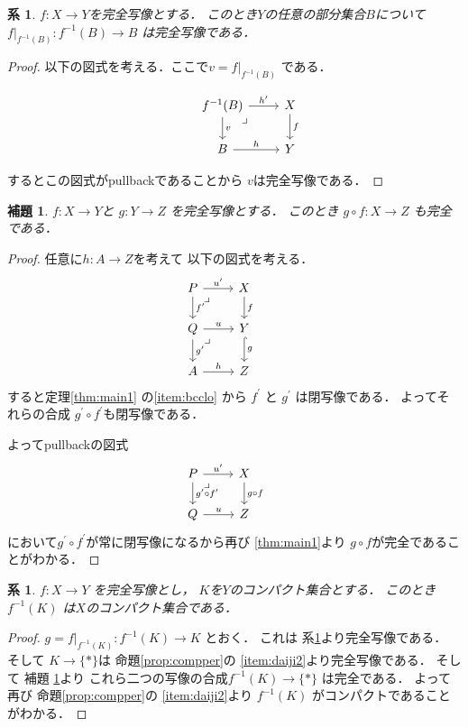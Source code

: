 \documentclass[leqno, a4paper, 12pt, dvipdfmx]{jsarticle}
\newtheorem{cor}[thm]{系}
\newtheorem{lem}[thm]{補題}
\begin{document}
\begin{cor}\label{cor:seigen}
$f\colon X\to Y$を完全写像とする．
このとき$Y$の任意の部分集合$B$について
$f|_{f^{-1}(B)}\colon f^{-1}(B)\to B$
は完全写像である．
\end{cor}
\begin{proof}
以下の図式を考える．ここで$v=f|_{f^{-1}(B)}$
である．

\[
\begin{tikzcd}
& f^{-1}(B) \arrow[d,"v"]  \arrow[r, "h^{\prime}"]\arrow[dr, phantom, "\lrcorner", very near start] & X \arrow[d, "f"]\\
& B \arrow[r, "\text{$h$}"]& Y
\end{tikzcd}
\]

するとこの図式がpullbackであることから
$v$は完全写像である．
\end{proof}



\begin{lem}\label{lem:percompp}
$f\colon X\to Y$と
$g\colon Y\to Z$
を完全写像とする．
このとき
$g\circ f\colon X\to Z$
も完全である．
\end{lem}
\begin{proof}
任意に$h\colon A\to Z$を考えて
以下の図式を考える．
\[
\begin{tikzcd}
P \arrow[r, "u^{\prime}"] \arrow[d, "f^{\prime}"] \arrow[dr, phantom, "\lrcorner", very near start]
& X \arrow[d,"f"] & \\
Q  \arrow[dr, phantom, "\lrcorner", very near start]\arrow[r,"u"] \arrow[d, "g^{\prime}"] & Y \arrow[d, hook, "g"] \\
A\arrow[r,"h"] &  Z
\end{tikzcd}
\]
すると定理\ref{thm:main1}
の\ref{item:bcclo}
から
$f^{\prime}$
と
$g^{\prime}$
は閉写像である．
よってそれらの合成
$g^{\prime}\circ f^{\prime}$も閉写像である．

よってpullbackの図式
\[
\begin{tikzcd}
P \arrow[r, "u^{\prime}"] \arrow[d, "g^{\prime}\circ f^{\prime}"] \arrow[dr, phantom, "\lrcorner", very near start]
& X \arrow[d,"g\circ f"] & \\
Q \arrow[r,"u"]  & Z
\end{tikzcd}
\]
において$g^{\prime}\circ f^{\prime}$が常に閉写像になるから再び
\ref{thm:main1}より
$g\circ f$が完全であることがわかる．
\end{proof}


\begin{cor}\label{cor:precon}
$f\colon X\to Y$
を完全写像とし，
$K$を$Y$のコンパクト集合とする．
このとき$f^{-1}(K)$
は$X$のコンパクト集合である．
\end{cor}
\begin{proof}
$g=f|_{f^{-1}(K)}\colon f^{-1}(K)\to K$
とおく．
これは
系\ref{cor:seigen}より完全写像である．
そして
$K\to \{*\}$は
命題\ref{prop:compper}の
\ref{item:daiji2}より完全写像である．
そして
補題
\ref{lem:percompp}より
これら二つの写像の合成$f^{-1}(K)\to \{*\}$
は完全である．
よって再び
命題\ref{prop:compper}の
\ref{item:daiji2}より
$f^{-1}(K)$
がコンパクトであることがわかる．
\end{proof}
\end{document}
